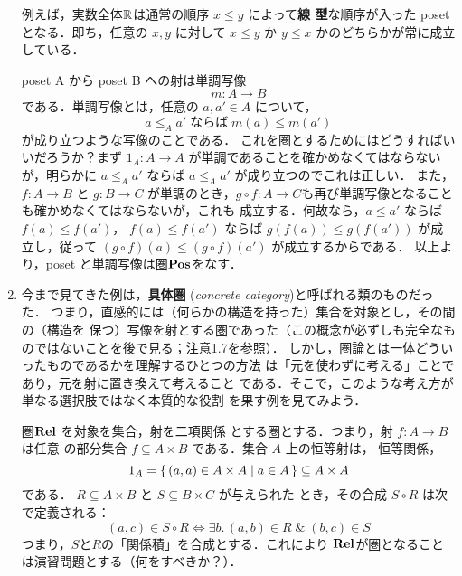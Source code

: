 \begin{enumerate}
       例えば，実数全体$\mathbb{R}$は通常の順序 $x \leq y$ によって{\bfseries 線
       型}な順序が入った poset となる．即ち，任意の $x, y$ に対して $x
       \leq y$ か $y \leq x$ かのどちらかが常に成立している．

       poset A から poset B への射は単調写像
       \[
	m : A \to B
       \]
       である．単調写像とは，任意の $a, a' \in A$ について，
       \[
	a \leq_A a'\; \text{ならば}\; m(a) \leq m(a')
       \]
       が成り立つような写像のことである．
       これを圏とするためにはどうすればいいだろうか？まず $1_A : A \to
       A$ が単調であることを確かめなくてはならないが，明らかに $a \leq_A
       a'$ ならば $a \leq_A a'$ が成り立つのでこれは正しい．
       また，$f:A \to B$ と $g: B \to C$ が単調のとき，$g \circ f : A
       \to C $も再び単調写像となることも確かめなくてはならないが，これも
       成立する．何故なら，$a \leq a'$ ならば $f(a) \leq f(a')$，
       $f(a) \leq f(a')$ ならば $g(f(a)) \leq g(f(a'))$ が成立し，従って
       $(g\circ f)(a) \leq (g\circ f)(a')$ が成立するからである．
       以上より，poset と単調写像は圏$\mathbf{Pos}$をなす．
 \item 今まで見てきた例は，{\bfseries 具体圏}
       ({\itshape concrete category})と呼ばれる類のものだった．
       つまり，直感的には（何らかの構造を持った）集合を対象とし，その間の（構造を
       保つ）写像を射とする圏であった（この概念が必ずしも完全なも
       のではないことを後で見る；注意1.7を参照）．
       しかし，圏論とは一体どういったものであるかを理解するひとつの方法
       は「元を使わずに考える」ことであり，元を射に置き換えて考えること
       である．そこで，このような考え方が単なる選択肢ではなく本質的な役割
       を果す例を見てみよう．

       圏$\mathbf{Rel}$ を対象を集合，射を二項関係
       とする圏とする．つまり，射 $f: A\to B$は任意
       の部分集合 $f \subseteq A \times B$ である．集合 $A$ 上の恒等射は，
       恒等関係，
       \[
	1_A = \set{(a,a) \in A \times A | a \in A} \subseteq A \times A
       \]
       である．
       $R \subseteq A \times B$ と $S \subseteq B \times C$ が与えられた
       とき，その合成 
       $S \circ R$ は次で定義される：
       \[
	(a, c) \in S \circ R \iff \exists b.\,(a, b) \in R\;\&\; (b, c) \in S
       \]
       つまり，$S$と$R$の「関係積」を合成とする．これにより
       $\mathbf{Rel}$が圏となることは演習問題とする（何をすべきか？）．


\end{enumerate}

